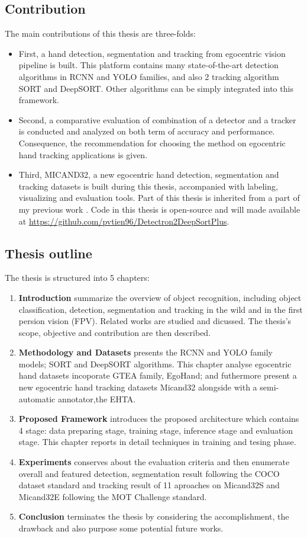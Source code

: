 \subsection{Contribution}
The main contributions of this thesis are three-folds:
\begin{itemize}
	\item First, a hand detection, segmentation and tracking from egocentric vision pipeline is built. This platform contains many state-of-the-art detection algorithms in RCNN and YOLO families, and also 2 tracking algorithm SORT and DeepSORT. Other algorithms can be simply integrated into this framework.
	\item Second, a comparative evaluation of combination of a detector and a tracker is conducted and analyzed on both term of accuracy and performance. Consequence, the recommendation for choosing the method on egocentric hand tracking applications is given.
	\item Third, MICAND32, a new egocentric hand detection, segmentation and tracking datasets is built during this thesis, accompanied with labeling, visualizing and evaluation tools.
	Part of this thesis is inherited from a part of my previous work \cite{tien}. Code in this thesis is open-source and will made available at  \url{https://github.com/pvtien96/Detectron2DeepSortPlus}.
\end{itemize}
\subsection{Thesis outline}
The thesis is structured into 5 chapters:
\begin{enumerate}
	\item \textbf{Introduction} summarize the overview of object recognition, including object classification, detection, segmentation and tracking in the wild and in the first persion vision (FPV). Related works are studied and dicussed. The thesis's scope, objective and contribution are then described.
	\item \textbf{Methodology and Datasets} presents the RCNN and YOLO family models; SORT and DeepSORT algorithms. This chapter analyse egocentric hand datasets incoporate GTEA family, EgoHand; and futhermore present a new egocentric hand tracking datasets Micand32 alongside with a semi-automatic annotator,the EHTA.
	\item \textbf{Proposed Framework} introduces the proposed architecture which contains 4 stage: data preparing stage, training stage, inference stage and evaluation stage. This chapter reports in detail techniques in training and tesing phase.
	\item \textbf{Experiments} conserves about the evaluation criteria and then enumerate overall and featured detection, segmentation result following the COCO dataset standard and tracking result of 11 aproaches on Micand32S and Micand32E following the MOT Challenge standard. 
	\item \textbf{Conclusion} terminates the thesis by considering the accomplishment, the drawback and also purpose some potential future works.
\end{enumerate}
